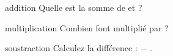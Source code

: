 \documentclass{article}
\begin{document}
\begin{question}{addition}
  Quelle est la somme de \QIa{} et \QIb{} ?
  \begin{reponses}
    \bonne{\QIsomme}
    \mauvaise{\QIerrA}
    \mauvaise{\QIerrB}
  \end{reponses}
\end{question}

\begin{question}{multiplication}
  Combien font \QIIa{} multiplié par \QIIb{} ?
  \begin{reponses}
    \bonne{\QIIprod}
    \mauvaise{\QIIerrA}
    \mauvaise{\QIIerrB}
  \end{reponses}
\end{question}

\begin{question}{soustraction}
  Calculez la différence : \QIIIa{} $-$ \QIIIb{}.
  \begin{reponses}
    \bonne{\QIIIdiff}
    \mauvaise{\QIIIerrA}
    \mauvaise{\QIIIerrB}
  \end{reponses}
\end{question}
\end{document}

